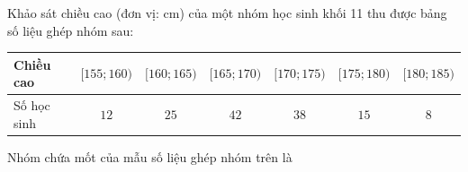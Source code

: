\begin{ex}
Khảo sát chiều cao (đơn vị: cm) của một nhóm học sinh khối 11 thu được bảng số liệu ghép nhóm sau:
\begin{center}\small\begin{tabular}{|l|c|c|c|c|c|c|}\hline
Chiều cao & $[155;160)$ & $[160;165)$ & $[165;170)$ & $[170;175)$ & $[175;180)$ & $[180;185)$\\\hline
Số học sinh & $12$ & $25$ & $42$ & $38$ & $15$ & $8$\\\hline
\end{tabular}\end{center}
Nhóm chứa mốt của mẫu số liệu ghép nhóm trên là
\choice{$[155;160)$}{\True $[165;170)$}{$[170;175)$}{$[180;185)$}
\loigiai{Nhóm có tần số lớn nhất ($42$) là $[165;170)$.}
\end{ex}
